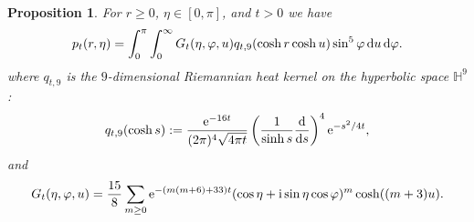 \documentclass[10pt,a4paper]{amsart}
\numberwithin{equation}{section}
\newtheorem{Proposition}[Theorem]{Proposition}
 { \theoremstyle{definition}
\newtheorem{Example}[Theorem]{Example}
\newtheorem{Remark}[Theorem]{Remark} }
\begin{document}
\begin{Proposition}\label{prop:3}
For $r\geq 0$, $\eta\in [0,\pi]$, and $t>0$ we have
\begin{gather*}
p_t(r,\eta)= \int_0^\pi \int_{0}^{\infty} G_t(\eta, \varphi, u) q_{t,9}(\cosh r \cosh u) \sin^5 \varphi \, {\rm d}u \, {\rm d} \varphi .
\end{gather*}
where $q_{t,9}$ is the $9$-dimensional Riemannian heat kernel on the hyperbolic space $\mathbb{H}^{9}$:
\begin{gather*}%
q_{t,9}(\cosh s):=\frac{{\rm e}^{-16t}}{(2\pi)^4 \sqrt{4\pi t}}\left(\frac{1}{\sinh s}\frac{{\rm d}}{{\rm d}s}\right)^{4}{\rm e}^{-s^2/4t},
\end{gather*}
and
\begin{gather}\label{function G}
 G_t(\eta, \varphi, u)
= \frac{15}{8} \sum_{m\geq 0}{\rm e}^{-(m(m+6)+33)t} (\cos \eta + {\rm i}\sin \eta \cos \varphi)^m \cosh((m+3)u).
\end{gather}
\end{Proposition}
\end{document}
